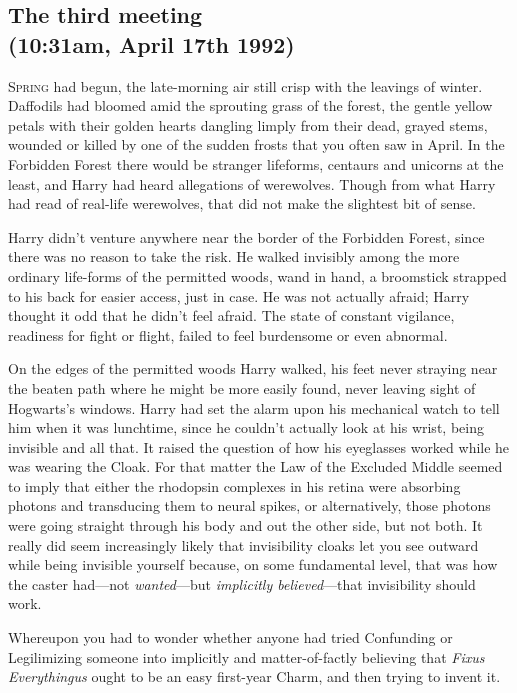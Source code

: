 
\label{ch-RolesVI}

\subsection{The third meeting\\
(10:31am, April 17th 1992)}

\lettrine{S}{pring} had begun, the late-morning air still crisp with the leavings of winter.
Daffodils had bloomed amid the sprouting grass of the forest, the gentle yellow
petals with their golden hearts dangling limply from their dead, grayed stems,
wounded or killed by one of the sudden frosts that you often saw in April. In
the Forbidden Forest there would be stranger lifeforms, centaurs and unicorns
at the least, and Harry had heard allegations of werewolves. Though from what
Harry had read of real-life werewolves, that did not make the slightest bit of
sense.

Harry didn't venture anywhere near the border of the Forbidden Forest, since
there was no reason to take the risk. He walked invisibly among the more
ordinary life-forms of the permitted woods, wand in hand, a broomstick strapped
to his back for easier access, just in case. He was not actually afraid; Harry
thought it odd that he didn't feel afraid. The state of constant vigilance,
readiness for fight or flight, failed to feel burdensome or even abnormal.

On the edges of the permitted woods Harry walked, his feet never straying near
the beaten path where he might be more easily found, never leaving sight of
Hogwarts's windows. Harry had set the alarm upon his mechanical watch to tell
him when it was lunchtime, since he couldn't actually look at his wrist, being
invisible and all that. It raised the question of how his eyeglasses worked
while he was wearing the Cloak. For that matter the Law of the Excluded Middle
seemed to imply that either the rhodopsin complexes in his retina were
absorbing photons and transducing them to neural spikes, or alternatively,
those photons were going straight through his body and out the other side, but
not both. It really did seem increasingly likely that invisibility cloaks let
you see outward while being invisible yourself because, on some fundamental
level, that was how the caster had---not \emph{wanted}---but \emph{implicitly
believed}---that invisibility should work.

Whereupon you had to wonder whether anyone had tried Confunding or Legilimizing
someone into implicitly and matter-of-factly believing that \emph{Fixus
Everythingus} ought to be an easy first-year Charm, and then trying to invent
it.

